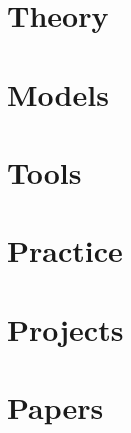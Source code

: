 \documentclass[a4paper,10pt]{book}
\begin{document}
\frontmatter{}

\cleardoublepage{}
\tableofcontents{}
\cleardoublepage{}
\listoffigures{}
\cleardoublepage{}
\listoftables{}


\mainmatter{}

\part{Theory}
\label{part:theory}













\part{Models}
\label{part:models}




\part{Tools}
\label{part:tools}





\part{Practice}
\label{part:practice}




\part{Projects}
\label{part:projects}

\part{Papers}
\label{part:papers}



\backmatter{}
\cleardoublepage{}


\cleardoublepage{}
\printindex{}
\end{document}

